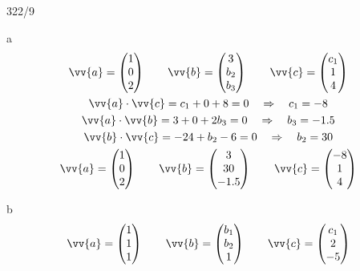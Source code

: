 \begin{exercise}{322/9}
  \item [a]
  \begin{gather*}
    \vv{a} = \begin{pmatrix}1 \\ 0 \\ 2\end{pmatrix} \qquad \vv{b} = \begin{pmatrix}3 \\ b_2 \\ b_3\end{pmatrix} \qquad \vv{c} = \begin{pmatrix}c_1 \\ 1 \\ 4\end{pmatrix} \\
    \vv{a} \cdot \vv{c} = c_1 + 0 + 8 = 0 \quad\Rightarrow\quad c_1 = -8 \\
    \vv{a} \cdot \vv{b} = 3 + 0 + 2b_3 = 0 \quad\Rightarrow\quad b_3 = -1.5 \\
    \vv{b} \cdot \vv{c} = -24 + b_2 - 6 = 0 \quad\Rightarrow\quad b_2 = 30 \\
    \vv{a} = \begin{pmatrix}1 \\ 0 \\ 2\end{pmatrix} \qquad \vv{b} = \begin{pmatrix}3 \\ 30 \\ -1.5\end{pmatrix} \qquad \vv{c} = \begin{pmatrix}-8 \\ 1 \\ 4\end{pmatrix}
  \end{gather*}
  \item [b]
  \begin{gather*}
    \vv{a} = \begin{pmatrix}1 \\ 1 \\ 1\end{pmatrix} \qquad \vv{b} = \begin{pmatrix}b_1 \\ b_2 \\ 1\end{pmatrix} \qquad \vv{c} = \begin{pmatrix}c_1 \\ 2 \\ -5\end{pmatrix} \\

\end{gather*}
\end{exercise}
